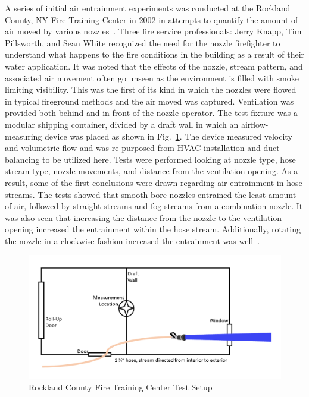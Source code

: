 \documentclass[12pt,oneside]{book}
\begin{document}
A series of initial air entrainment experiments was conducted at the Rockland County, NY Fire Training Center in 2002 in attempts to quantify the amount of air moved by various nozzles~\cite{KnappNozzles1}. Three fire service professionals: Jerry Knapp, Tim Pillsworth, and Sean White recognized the need for the nozzle firefighter to understand what happens to the fire conditions in the building as a result of their water application. It was noted that the effects of the nozzle, stream pattern, and associated air movement often go unseen as the environment is filled with smoke limiting visibility. This was the first of its kind in which the nozzles were flowed in typical fireground methods and the air moved was captured. Ventilation was provided both behind and in front of the nozzle operator. The test fixture was a modular shipping container, divided by a draft wall in which an airflow-measuring device was placed as shown in Fig.~\ref{fig:Rockland_County_Test_Setup}. The device measured velocity and volumetric flow and was re-purposed from HVAC installation and duct balancing to be utilized here. Tests were performed looking at nozzle type, hose stream type, nozzle movements, and distance from the ventilation opening. As a result, some of the first conclusions were drawn regarding air entrainment in hose streams. The tests showed that smooth bore nozzles entrained the least amount of air, followed by straight streams and fog streams from a combination nozzle. It was also seen that increasing the distance from the nozzle to the ventilation opening increased the entrainment within the hose stream. Additionally, rotating the nozzle in a clockwise fashion increased the entrainment was well~\cite{KnappNozzles1,KnappNozzles2,KnappNozzles3}.

\begin{figure}[!ht]
	\centering
	\includegraphics[width=\columnwidth]{Figures/Air_Entrainment/Knapp_Layout.png}
	\caption{Rockland County Fire Training Center Test Setup}
	\label{fig:Rockland_County_Test_Setup}
\end{figure}
\end{document}
